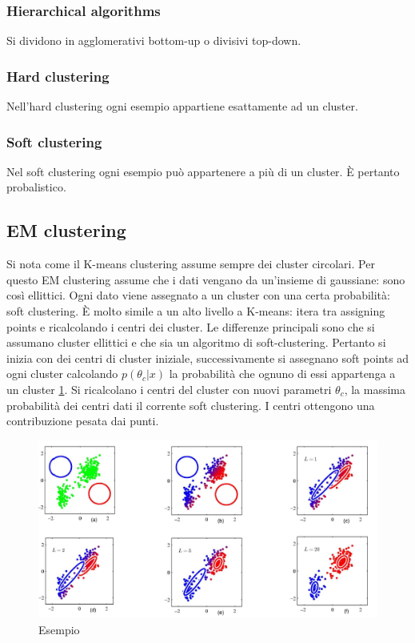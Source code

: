 		\subsubsection{Hierarchical algorithms}
		Si dividono in agglomerativi bottom-up o divisivi top-down.
		
		\subsubsection{Hard clustering}
		Nell'hard clustering ogni esempio appartiene esattamente ad un cluster.
		
		\subsubsection{Soft clustering}
		Nel soft clustering ogni esempio pu\`o appartenere a pi\`u di un cluster.
		\`E pertanto probalistico.

	\subsection{EM clustering}
	Si nota come il K-means clustering assume sempre dei cluster circolari.
	Per questo EM clustering assume che i dati vengano da un'insieme di gaussiane: sono cos\`i ellittici.
	Ogni dato viene assegnato a un cluster con una certa probabilit\`a: soft clustering.
	\`E molto simile a un alto livello a K-means: itera tra assigning points e ricalcolando i centri dei cluster.
	Le differenze principali sono che si assumano cluster ellittici e che sia un algoritmo di soft-clustering.
	Pertanto si inizia con dei centri di cluster iniziale, successivamente si assegnano soft points ad ogni cluster calcolando $p(\theta_c|x)$ la probabilit\`a che ognuno di essi appartenga a un cluster \ref{fig:chapter12-12}.
	Si ricalcolano i centri del cluster con nuovi parametri $\theta_c$, la massima probabilit\`a dei centri dati il corrente soft clustering.
	I centri ottengono una contribuzione pesata dai punti.
	\begin{figure}
		\centering
		\includegraphics[width=0.8\linewidth]{imgs/chapter12/img12}
		\caption{Esempio}
		\label{fig:chapter12-12}
	\end{figure}

